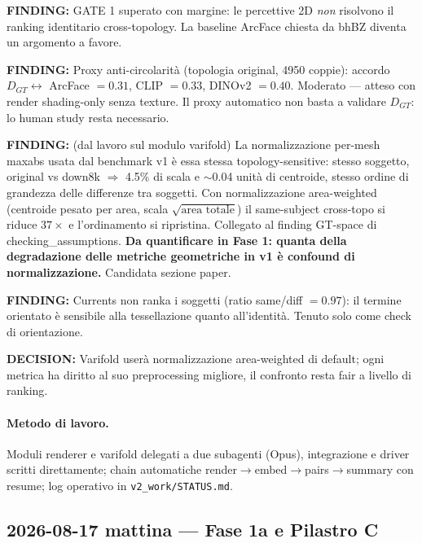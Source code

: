 \documentclass[11pt,a4paper]{article}
\newcommand{\finding}[1]{\textcolor{finding}{\textbf{FINDING:}} #1}
\newcommand{\decision}[1]{\textcolor{decision}{\textbf{DECISION:}} #1}
\begin{document}
\finding{GATE 1 superato con margine: le percettive 2D \emph{non} risolvono il ranking
identitario cross-topology. La baseline ArcFace chiesta da bhBZ diventa un argomento a favore.}

\finding{Proxy anti-circolarit\`a (topologia original, 4950 coppie): accordo
$D_{GT}\leftrightarrow$ ArcFace $=0.31$, CLIP $=0.33$, DINOv2 $=0.40$. Moderato ---
atteso con render shading-only senza texture. Il proxy automatico non basta a validare
$D_{GT}$: lo human study resta necessario.}

\finding{(dal lavoro sul modulo varifold) La normalizzazione per-mesh maxabs usata dal
benchmark v1 \`e essa stessa topology-sensitive: stesso soggetto, original vs down8k
$\Rightarrow$ 4.5\% di scala e $\sim$0.04 unit\`a di centroide, stesso ordine di grandezza
delle differenze tra soggetti. Con normalizzazione area-weighted (centroide pesato per area,
scala $\sqrt{\text{area totale}}$) il same-subject cross-topo si riduce $37\times$ e
l'ordinamento si ripristina. Collegato al finding GT-space di checking\_assumptions.
\textbf{Da quantificare in Fase 1: quanta della degradazione delle metriche geometriche
in v1 \`e confound di normalizzazione.} Candidata sezione paper.}

\finding{Currents non ranka i soggetti (ratio same/diff $=0.97$): il termine orientato \`e
sensibile alla tessellazione quanto all'identit\`a. Tenuto solo come check di orientazione.}

\decision{Varifold user\`a normalizzazione area-weighted di default; ogni metrica ha diritto
al suo preprocessing migliore, il confronto resta fair a livello di ranking.}

\paragraph{Metodo di lavoro.} Moduli renderer e varifold delegati a due subagenti
(Opus), integrazione e driver scritti direttamente; chain automatiche
render$\to$embed$\to$pairs$\to$summary con resume; log operativo in \texttt{v2\_work/STATUS.md}.

\subsection{2026-08-17 mattina --- Fase 1a e Pilastro C}
\end{document}
